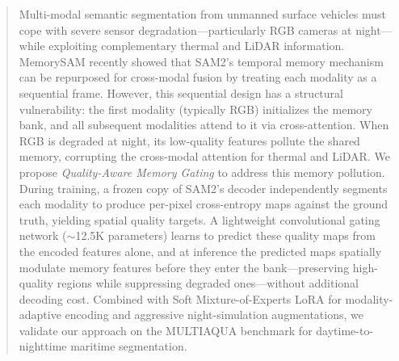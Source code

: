 \begin{abstract}
Multi-modal semantic segmentation from unmanned surface vehicles must cope with severe sensor degradation---particularly RGB cameras at night---while exploiting complementary thermal and LiDAR information.
MemorySAM recently showed that SAM2's temporal memory mechanism can be repurposed for cross-modal fusion by treating each modality as a sequential frame.
However, this sequential design has a structural vulnerability: the first modality (typically RGB) initializes the memory bank, and all subsequent modalities attend to it via cross-attention.
When RGB is degraded at night, its low-quality features pollute the shared memory, corrupting the cross-modal attention for thermal and LiDAR.
We propose \emph{Quality-Aware Memory Gating} to address this memory pollution.
During training, a frozen copy of SAM2's decoder independently segments each modality to produce per-pixel cross-entropy maps against the ground truth, yielding spatial quality targets.
A lightweight convolutional gating network (${\sim}$12.5K parameters) learns to predict these quality maps from the encoded features alone, and at inference the predicted maps spatially modulate memory features before they enter the bank---preserving high-quality regions while suppressing degraded ones---without additional decoding cost.
Combined with Soft Mixture-of-Experts LoRA for modality-adaptive encoding and aggressive night-simulation augmentations, we validate our approach on the MULTIAQUA benchmark for daytime-to-nighttime maritime segmentation.
\end{abstract}
